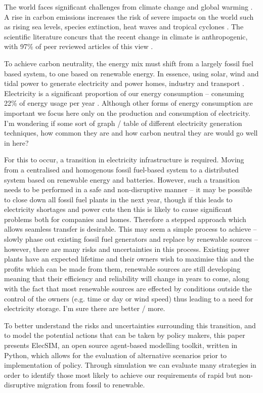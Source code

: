 
The world faces significant challenges from climate change and global warming \cite{Masson-Delmotte2018}. A rise in carbon emissions increases the risk of severe impacts on the world such as rising sea levels, species extinction, heat waves and tropical cyclones \cite{IPCC2014}. The scientific literature concurs that the recent change in climate is anthropogenic, with 97\% of peer reviewed articles of this view \cite{Cook2013}.  

To achieve carbon neutrality, the energy mix must shift from a largely fossil fuel based system, to one based on renewable energy. In essence, using solar, wind and tidal power to generate electricity and power homes, industry and transport \cite{Hoffert2002}. Electricity is a significant proportion of our energy consumption -- consuming 22\% of energy usage per year \cite{Lakshmi2017}. Although other forms of energy consumption are important we focus here only on the production and consumption of electricity. {\color{red}I'm wondering if some sort of graph / table of different electricity generation techniques, how common they are and how carbon neutral they are would go well in here?}

For this to occur, a transition in electricity infrastructure is required. Moving from a centralised and homogenous fossil fuel-based system to a distributed system based on renewable energy and batteries. However, such a transition needs to be performed in a safe and non-disruptive manner -- it may be possible to close down all fossil fuel plants in the next year, though if this leads to electricity shortages and power cuts then this is likely to cause significant problems both for companies and homes. Therefore a stepped approach which allows seamless transfer is desirable. This may seem a simple process to achieve -- slowly phase out existing fossil fuel generators and replace by renewable sources -- however, there are many risks and uncertainties in this process. Existing power plants have an expected lifetime and their owners wish to maximise this and the profits which can be made from them, renewable sources are still developing meaning that their efficiency and reliability will change in years to come, along with the fact that most renewable sources are effected by conditions outside the control of the owners (e.g. time or day or wind speed) thus leading to a need for electricity storage. {\color{red}I'm sure there are better / more.}

To better understand the risks and uncertainties surrounding this transition, and to model the potential actions that can be taken by policy makers, this paper presents ElecSIM, an open source agent-based modelling toolkit, written in Python, which allows for the evaluation of alternative scenarios prior to implementation of policy. Through simulation we can evaluate many strategies in order to identify those most likely to achieve our requirements of rapid but non-disruptive migration from fossil to renewable.

